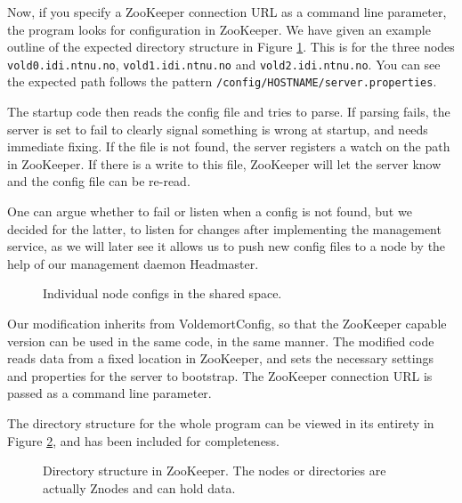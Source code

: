 Now, if you specify a ZooKeeper connection URL as a command line parameter, the program looks for configuration in ZooKeeper.
We have given an example outline of the expected directory structure in Figure \ref{fig:configdirs}. This is for the three nodes \texttt{vold0.idi.ntnu.no}, \texttt{vold1.idi.ntnu.no} and \texttt{vold2.idi.ntnu.no}. You can see the expected path follows the pattern \texttt{/config/HOSTNAME/server.properties}. 

The startup code then reads the config file and tries to parse. If parsing fails, the server is set to fail to clearly signal something is wrong at startup, and needs immediate fixing. If the file is not found, the server registers a watch on the path in ZooKeeper. If there is a write to this file, ZooKeeper will let the server know and the config file can be re-read. 

One can argue whether to fail or listen when a config is not found, but we decided for the latter, to listen for changes after implementing the management service, as we will later see it allows us to push new config files to a node by the help of our management daemon Headmaster. 

\begin{figure}[h]
\caption{Individual node configs in the shared space.}
\label{fig:configdirs}
\end{figure}

Our modification inherits from VoldemortConfig, so that the ZooKeeper capable version can be used in the same code, in the same manner. The modified code reads data from a fixed location in ZooKeeper, and sets the necessary settings and properties for the server to bootstrap. The ZooKeeper connection URL is passed as a command line parameter.

The directory structure for the whole program can be viewed in its entirety in Figure \ref{fig:dirstruct}, and has been included for completeness.

\begin{figure}[h]
\caption{Directory structure in ZooKeeper. The nodes or directories are actually Znodes and can hold data.}
\label{fig:dirstruct}
\end{figure}

